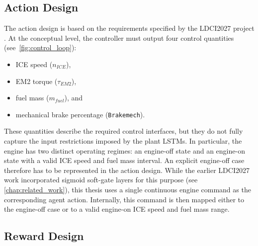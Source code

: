 \subsection{Action Design}
\label{subsec:method_action}
The action design is based on the requirements specified by the \ac{LDCI2027} project \cite{universitat_politecnica_de_catalunya_development_2025}. At the conceptual level, the controller must output four control quantities (see~\autoref{fig:control_loop}):
\begin{itemize}
  \item \ac{ICE} speed ($n_{ICE}$),
  \item \ac{EM2} torque ($\tau_{EM2}$),
  \item fuel mass ($m_{fuel}$), and
  \item mechanical brake percentage (\texttt{Brakemech}).
\end{itemize}

These quantities describe the required control interfaces, but they do not fully capture the input restrictions imposed by the plant \ac{LSTM}s. In particular, the engine has two distinct operating regimes: an engine-off state and an engine-on state with a valid \ac{ICE} speed and fuel mass interval. An explicit engine-off case therefore has to be represented in the action design. While the earlier \ac{LDCI2027} work incorporated sigmoid soft-gate layers for this purpose \cite{universitat_politecnica_de_catalunya_development_2025} (see \autoref{chap:related_work}), this thesis uses a single continuous engine command as the corresponding agent action. Internally, this command is then mapped either to the engine-off case or to a valid engine-on \ac{ICE} speed and fuel mass range.

\subsection{Reward Design}
\label{subsec:method_reward}

